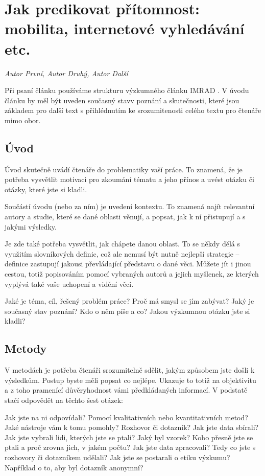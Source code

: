 
\chapter{Jak predikovat přítomnost: mobilita, internetové vyhledávání etc.}
\label{Predikce_pritomnosti}

\textit{Autor První, Autor Druhý, Autor Další}
\vspace{15mm}

   Při psaní článku používáme strukturu výzkumného článku IMRAD \cite{tulinska}. V úvodu článku by měl být uveden současný stavv poznání \cite{colu92} a skutečnosti, které jsou základem pro další text \cite{phil99} s přihlédnutím ke srozumitenosti celého textu pro čtenáře mimo obor.


\section*{Úvod} 

Úvod skutečně uvádí čtenáře do problematiky vaší práce. To znamená, že je potřeba vysvětlit motivaci pro zkoumání tématu a jeho přínos a uvést otázku či otázky, které jste si kladli.  

Součástí úvodu (nebo za ním) je uvedení kontextu. To znamená najít relevantní autory a studie, které se dané oblasti věnují, a popsat, jak k ní přistupují a s jakými výsledky.  

Je zde také potřeba vysvětlit, jak chápete danou oblast. To se někdy dělá s využitím slovníkových definic, což ale nemusí být nutně nejlepší strategie – definice zastupují jakousi převládající představu o dané věci. Můžete jít i jinou cestou, totiž popisováním pomocí vybraných autorů a jejich myšlenek, ze kterých vyplývá také vaše uchopení a vidění věci. 

    Jaké je téma, cíl, řešený problém práce? Proč má smysl se jím zabývat? 
    Jaký je současný stav poznání? Kdo o něm píše a co? 
    Jakou výzkumnou otázku jste si kladli? 

\section*{Metody} 

V metodách je potřeba čtenáři srozumitelně sdělit, jakým způsobem jste došli k výsledkům. Postup byste měli popsat co nejlépe. Ukazuje to totiž na objektivitu a z toho pramenící důvěryhodnost vámi předkládaných informací. V podstatě stačí odpovědět na těchto šest otázek: 

    Jak jste na ni odpovídali? Pomocí kvalitativních nebo kvantitativních metod? 
    Jaké nástroje vám k tomu pomohly? Rozhovor či dotazník?
    Jak jste data sbírali? Jak jste vybrali lidi, kterých jste se ptali? 
    Jaký byl vzorek? Koho přesně jste se ptali a proč zrovna jich, v jakém počtu? 
    Jak jste data zpracovali? Tedy co jste s rozhovory či dotazníkem udělali? 
    Jak jste se postarali o etiku výzkumu? Například o to, aby byl dotazník anonymní? 

